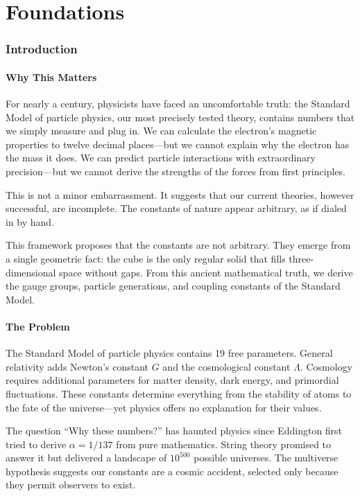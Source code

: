 \documentclass[11pt,a4paper]{article}
\theoremstyle{plain}
\theoremstyle{definition}
\theoremstyle{remark}
\begin{document}
\part{Foundations}

\section{Introduction}

\subsection{Why This Matters}

For nearly a century, physicists have faced an uncomfortable truth: the Standard Model of particle physics, our most precisely tested theory, contains numbers that we simply measure and plug in. We can calculate the electron's magnetic properties to twelve decimal places---but we cannot explain why the electron has the mass it does. We can predict particle interactions with extraordinary precision---but we cannot derive the strengths of the forces from first principles.

This is not a minor embarrassment. It suggests that our current theories, however successful, are incomplete. The constants of nature appear arbitrary, as if dialed in by hand.

This framework proposes that the constants are not arbitrary. They emerge from a single geometric fact: the cube is the only regular solid that fills three-dimensional space without gaps. From this ancient mathematical truth, we derive the gauge groups, particle generations, and coupling constants of the Standard Model.

\subsection{The Problem}

The Standard Model of particle physics contains 19 free parameters. General relativity adds Newton's constant $G$ and the cosmological constant $\Lambda$. Cosmology requires additional parameters for matter density, dark energy, and primordial fluctuations. These constants determine everything from the stability of atoms to the fate of the universe---yet physics offers no explanation for their values.

The question ``Why these numbers?'' has haunted physics since Eddington first tried to derive $\alpha = 1/137$ from pure mathematics. String theory promised to answer it but delivered a landscape of $10^{500}$ possible universes. The multiverse hypothesis suggests our constants are a cosmic accident, selected only because they permit observers to exist.
\end{document}
